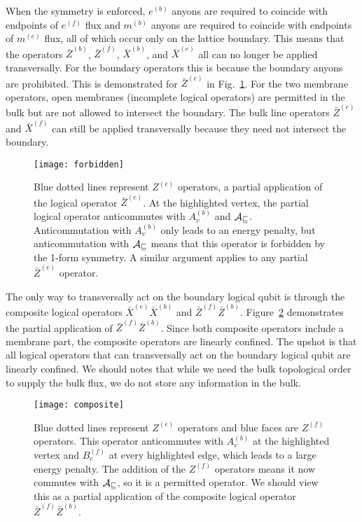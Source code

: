 When the symmetry is enforced, $e^{(b)}$ anyons are required to coincide with endpoints of $e^{(f)}$ flux and $m^{(b)}$ anyons are required to coincide with endpoints of $m^{(e)}$ flux, all of which occur only on the lattice boundary. This means that the operators $\bar{Z}^{(b)}$, $\bar{Z}^{(f)}$, $\bar{X}^{(b)}$, and $\bar{X}^{(e)}$ all can no longer be applied transversally.  For the boundary operators this is because the boundary anyons are prohibited. This is demonstrated for $\bar{Z}^{(e)}$ in Fig.~\ref{fig:forbidden}. For the two membrane operators, open membranes (incomplete logical operators) are permitted in the bulk but  are not allowed to intersect the boundary. The bulk line operators $\bar{Z}^{(e)}$ and $\bar{X}^{(f)}$ can still be applied transversally because they need not intersect the boundary. 

\begin{figure}[th!]
\centering
\texttt{[image: forbidden]}
\caption[Excitations on the boundary]{Blue dotted lines represent $Z^{(e)}$ operators, a partial application of the logical operator $\bar{Z}^{(e)}$. At the highlighted vertex, the partial logical operator anticommutes with $A_v^{(b)}$ and $\cal{A}_v$. Anticommutation with $A_v^{(b)}$ only leads to an energy penalty, but anticommutation with $\cal{A}_v$ means that this operator is forbidden by the 1-form symmetry. A similar argument applies to any partial $\bar{Z}^{(e)}$ operator.}
\label{fig:forbidden}
\end{figure}

The only way to transversally act on the boundary logical qubit is through the composite logical operators $\bar{X}^{(e)} \bar{X}^{(b)}$ and $\bar{Z}^{(f)} \bar{Z}^{(b)}$. Figure~\ref{fig:composite} demonstrates the partial application of $\bar{Z}^{(f)} \bar{Z}^{(b)}$. Since both composite operators include a membrane part, the composite operators are linearly confined. The upshot is that all logical operators that can transversally act on the boundary logical qubit are linearly confined. We should notes that while we need the bulk topological order to supply the bulk flux, we do not store any information in the bulk.

\begin{figure}[th!]
\centering
\texttt{[image: composite]}
\caption[Removing flux from the boundary]{Blue dotted lines represent $Z^{(e)}$ operators and blue faces are $Z^{(f)}$ operators. This operator anticommutes with $A_v^{(b)}$ at the highlighted vertex and $B_e^{(f)}$ at every highlighted edge, which leads to a large energy penalty. The addition of the $Z^{(f)}$ operators means it now commutes with $\cal{A}_v$, so it is a permitted operator. We should view this as a partial application of the composite logical operator $\bar{Z}^{(f)} \bar{Z}^{(b)}$.}
\label{fig:composite}
\end{figure}

